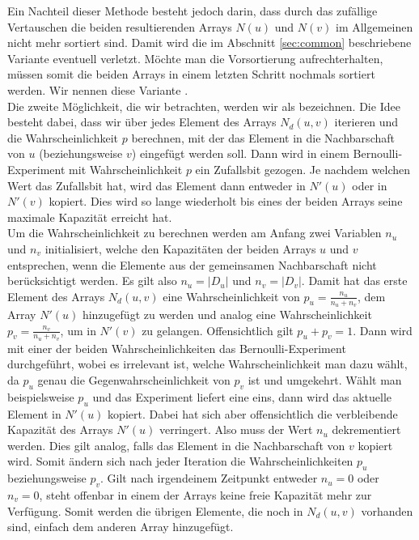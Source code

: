 Ein Nachteil dieser Methode besteht jedoch darin, dass durch das zufällige Vertauschen die beiden resultierenden Arrays
$N(u)$ und $N(v)$ im Allgemeinen nicht mehr sortiert sind. 
Damit wird die im Abschnitt \ref{sec:common} beschriebene
Variante eventuell verletzt. Möchte man die Vorsortierung aufrechterhalten, müssen somit die beiden Arrays
in einem letzten Schritt nochmals sortiert werden.
Wir nennen diese Variante \perm.
\\

Die zweite Möglichkeit, die wir betrachten, werden wir als \distr{} bezeichnen.
Die Idee besteht dabei, dass wir über jedes Element des Arrays $N_{d}(u,v)$ iterieren und 
die Wahrscheinlichkeit $p$ berechnen, mit
der das Element in die Nachbarschaft von $u$ (beziehungsweise $v$) eingefügt werden soll. Dann wird in einem 
Bernoulli-Experiment mit Wahrscheinlichkeit $p$ ein Zufallsbit gezogen. Je nachdem welchen
Wert das Zufallsbit hat, wird das Element dann entweder in $N'(u)$ oder in $N'(v)$ kopiert. Dies wird so lange
wiederholt bis eines der beiden Arrays seine maximale Kapazität erreicht hat. 
\\

Um die Wahrscheinlichkeit zu berechnen werden am Anfang zwei Variablen $n_u$ und $n_v$ initialisiert, 
welche den Kapazitäten der beiden Arrays $u$ und $v$ entsprechen, wenn die Elemente aus der 
gemeinsamen Nachbarschaft nicht berücksichtigt werden. Es gilt also $n_u = |D_{u}|$ und
$n_v= |D_{v}|$.
Damit hat das erste Element des Arrays $N_{d}(u,v)$ eine Wahrscheinlichkeit von $p_u = \frac{n_u}{n_u+n_v}$, dem
Array $N'(u)$ hinzugefügt zu werden und analog eine Wahrscheinlichkeit $p_v = \frac{n_v}{n_u+n_v}$, um
in $N'(v)$ zu gelangen. Offensichtlich gilt $p_u + p_v = 1$. Dann wird mit einer der beiden
Wahrscheinlichkeiten das Bernoulli-Experiment durchgeführt, wobei es irrelevant ist, welche Wahrscheinlichkeit
man dazu wählt, da $p_u$ genau die Gegenwahrscheinlichkeit von $p_v$ ist und umgekehrt. 
Wählt man beispielsweise $p_u$ und das Experiment liefert eine eins, dann wird das aktuelle Element
in $N'(u)$ kopiert. Dabei
hat sich aber offensichtlich die verbleibende Kapazität des Arrays $N'(u)$ verringert. Also muss
der Wert $n_u$ dekrementiert werden. Dies gilt analog, falls das Element in die Nachbarschaft von $v$ kopiert wird.
Somit ändern sich nach jeder Iteration die Wahrscheinlichkeiten $p_u$ beziehungsweise $p_v$.
Gilt nach irgendeinem Zeitpunkt entweder $n_u = 0$ oder $n_v = 0$, steht offenbar in einem der Arrays 
keine freie Kapazität mehr zur Verfügung. Somit werden die übrigen Elemente, die noch in $N_{d}(u,v)$ vorhanden sind, 
einfach dem anderen Array hinzugefügt.
\\

